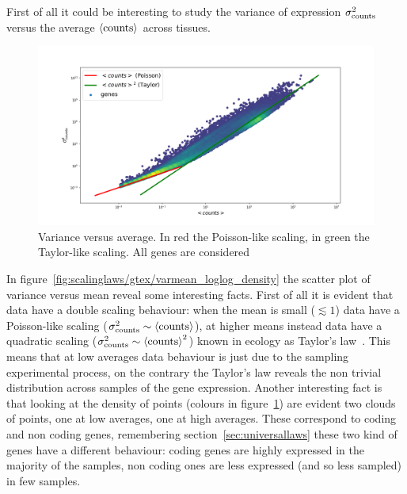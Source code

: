 First of all it could be interesting to study the variance of expression $\sigma^2_{\mathrm{counts}}$ versus 
the average $\left\langle \mathrm{counts}\right\rangle$ across tissues.
\begin{figure}[htb!]
    \centering
    \includegraphics[width=0.9\linewidth]{pictures/scalinglaws/gtex/allgenes/varmean_loglog.png}
    \caption{Variance versus average. In red the Poisson-like scaling, in green the Taylor-like scaling. All genes are considered}
    \label{fig:scalinglaws/gtex/allgenes/varmean_loglog_density}
\end{figure}
In figure~\ref{fig:scalinglaws/gtex/varmean_loglog_density} the scatter plot of variance versus mean reveal some interesting facts.
First of all it is evident that data have a double scaling behaviour: when the mean is small ($\lesssim 1$) data have a Poisson-like scaling ($\sigma^2_{\mathrm{counts}} \sim \left\langle \mathrm{counts}\right\rangle$), at higher means instead data have a quadratic scaling ($\sigma^2_{\mathrm{counts}} \sim \left\langle \mathrm{counts}\right\rangle^2$) known in ecology as Taylor's law~\cite{Eisler2008}. This means that at low averages data behaviour is just due to the sampling experimental process, on the contrary the Taylor's law reveals the non trivial distribution across samples of the gene expression.
Another interesting fact is that looking at the density of points (colours in figure~\ref{fig:scalinglaws/gtex/allgenes/varmean_loglog_density}) are evident two clouds of points, one at low averages, one at high averages. These correspond to coding and non coding genes, remembering section~\ref{sec:universallaws} these two kind of genes have a different behaviour: coding genes are highly expressed in the majority of the samples, non coding ones are less expressed (and so less sampled) in few samples. 

